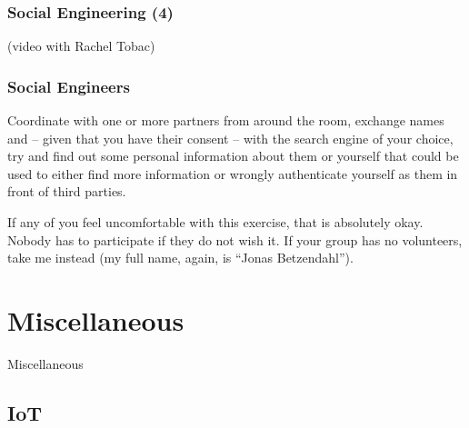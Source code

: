 \documentclass[aspectratio=169,dvipsnames]{beamer}
\begin{document}
\begin{frame}
\frametitle{Social Engineering (4)}

\begin{center}
(video with Rachel Tobac)
\end{center}
\end{frame}


\begin{frame}
\frametitle{Social Engineers}

Coordinate with one or more partners from around the room, exchange names and -- given that you have their consent -- with the search engine of your choice, try and find out some personal information about them or yourself that could be used to either find more information or wrongly authenticate yourself as them in front of third parties.
\bigskip

If any of you feel uncomfortable with this exercise, that is absolutely okay. Nobody has to participate if they do not wish it. If your group has no volunteers, take me instead (my full name, again, is ``Jonas Betzendahl'').

\end{frame}



\section{Miscellaneous}

\begin{frame}
\begin{center}
\huge Miscellaneous
\end{center}
\end{frame}

\subsection{IoT}
\end{document}
